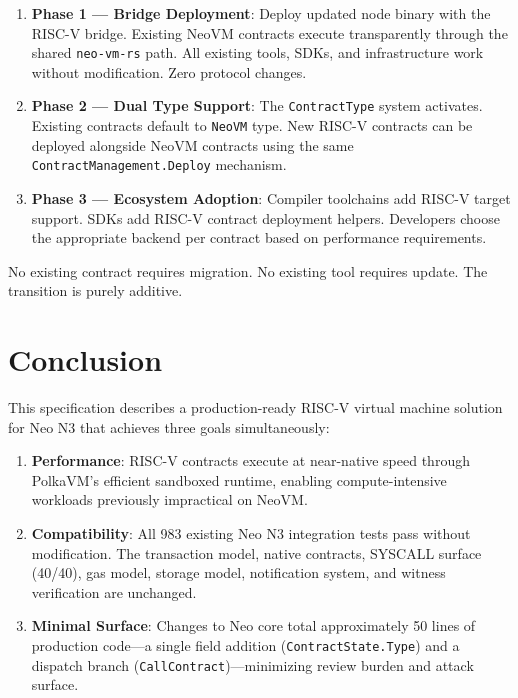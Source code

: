 \documentclass[11pt,a4paper]{article}
\begin{document}
\begin{enumerate}
    \item \textbf{Phase 1 --- Bridge Deployment}:
          Deploy updated node binary with the RISC-V bridge. Existing NeoVM
          contracts execute transparently through the shared \texttt{neo-vm-rs}
          path. All existing tools, SDKs, and infrastructure work without
          modification. Zero protocol changes.

    \item \textbf{Phase 2 --- Dual Type Support}:
          The \texttt{ContractType} system activates. Existing contracts
          default to \texttt{NeoVM} type. New RISC-V contracts can be
          deployed alongside NeoVM contracts using the same
          \texttt{ContractManagement.Deploy} mechanism.

    \item \textbf{Phase 3 --- Ecosystem Adoption}:
          Compiler toolchains add RISC-V target support. SDKs add RISC-V
          contract deployment helpers. Developers choose the appropriate
          backend per contract based on performance requirements.
\end{enumerate}

No existing contract requires migration. No existing tool requires update.
The transition is purely additive.

\section{Conclusion}
\label{sec:conclusion}

This specification describes a production-ready RISC-V virtual machine
solution for Neo N3 that achieves three goals simultaneously:

\begin{enumerate}[noitemsep]
    \item \textbf{Performance}: RISC-V contracts execute at near-native speed
          through PolkaVM's efficient sandboxed runtime, enabling
          compute-intensive workloads previously impractical on NeoVM.

    \item \textbf{Compatibility}: All 983 existing Neo N3 integration tests
          pass without modification. The transaction model, native contracts,
          SYSCALL surface (40/40), gas model, storage model, notification
          system, and witness verification are unchanged.

    \item \textbf{Minimal Surface}: Changes to Neo core total approximately
          50 lines of production code---a single field addition
          (\texttt{ContractState.Type}) and a dispatch branch
          (\texttt{CallContract})---minimizing review burden and attack
          surface.
\end{enumerate}
\end{document}
